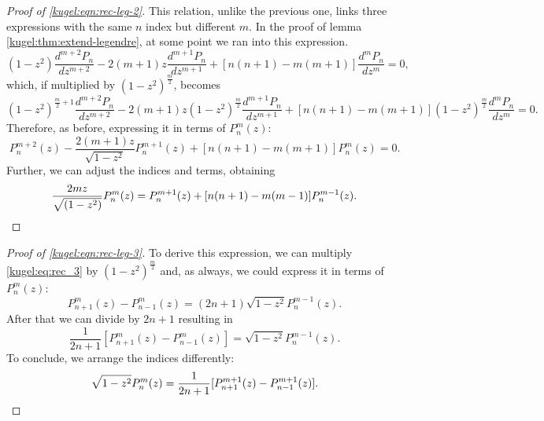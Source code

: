 \begin{proof}[Proof of \eqref{kugel:eqn:rec-leg-2}]
  This relation, unlike the previous one, links three expressions with the same
  $n$ index but different $m$. In the proof of lemma
  \ref{kugel:thm:extend-legendre}, at some point we ran into this expression.
  \begin{equation*}
    (1-z^2)\frac{d^{m+2}P_n}{dz^{m+2}}
    - 2(m+1)z \frac{d^{m+1}P_n}{dz^{m+1}}
    + [n(n+1)-m(m+1)]\frac{d^mP_n}{dz^m} = 0,
  \end{equation*}
  which, if multiplied by $(1-z^2)^{\frac{m}{2}}$, becomes
  \begin{equation*}
    (1-z^2)^{\frac{m}{2}+1}\frac{d^{m+2}P_n}{dz^{m+2}}
    - 2(m+1)z (1-z^2)^{\frac{m}{2}}\frac{d^{m+1}P_n}{dz^{m+1}}
    + [n(n+1)-m(m+1)](1-z^2)^{\frac{m}{2}}\frac{d^mP_n}{dz^m} = 0.
  \end{equation*}
  Therefore, as before, expressing it in terms of $P^m_n(z)$:
  \begin{equation*}
    P^{m+2}_n(z) - \frac{2(m+1)z}{\sqrt{1-z^2}}P^{m+1}_n(z)
    + [n(n+1)-m(m+1)]P^m_n(z)=0.
  \end{equation*}
  Further, we can adjust the indices and terms, obtaining
  \begin{equation*}
    \frac{2mz}{\sqrt{(1-z^2)}} P^m_n(z)
    = P^{m+1}_n(z) + [n(n+1)-m(m-1)] P^{m-1}_n(z).
    \qedhere
  \end{equation*}
\end{proof}

\begin{proof}[Proof of \eqref{kugel:eqn:rec-leg-3}]
  To derive this expression, we can multiply \eqref{kugel:eq:rec_3} by
  $(1-z^2)^{\frac{m}{2}}$ and, as always, we could express it in terms of
  $P^m_n(z)$:
  \begin{equation*}
    P^m_{n+1}(z) - P^m_{n-1}(z) = (2n+1)\sqrt{1-z^2}P^{m-1}_n(z).
  \end{equation*}
  After that we can divide by $2n+1$ resulting in
  \begin{equation}\label{kugel:eq:helper}
    \frac{1}{2n+1}[P^m_{n+1}(z) - P^m_{n-1}(z)] = \sqrt{1-z^2}P^{m-1}_n(z).
  \end{equation}
  To conclude, we arrange the indices differently:
  \begin{equation*}
    \sqrt{1-z^2}P^{m}_n(z)=\frac{1}{2n+1}[P^{m+1}_{n+1}(z) - P^{m+1}_{n-1}(z)].
    \qedhere
  \end{equation*}
\end{proof}

